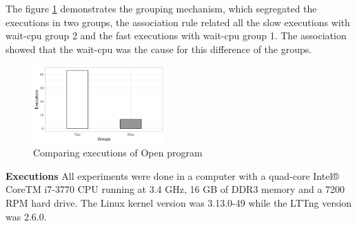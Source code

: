    The figure \ref{fig:group} demonstrates the grouping mechanism, which segregated the executions in two groups, the association rule related all the slow executions with wait-cpu group 2 and the fast executions with wait-cpu group 1. The association showed that the wait-cpu was the cause for this difference of the groups.
    
     \begin{figure}[h]
      \centering
        \includegraphics[width=0.45\textwidth]{figures/open-program-groups.png}
        \caption{Comparing executions of Open program}
        \label{fig:group}
    \end{figure}

    
    
\textbf{Executions}
    All experiments were done in a computer with a quad-core Intel® CoreTM i7-3770 CPU running at 3.4 GHz, 16 GB of DDR3 memory and a 7200 RPM hard drive. The Linux kernel version was 3.13.0-49 while the LTTng version was 2.6.0.
  
    
    
